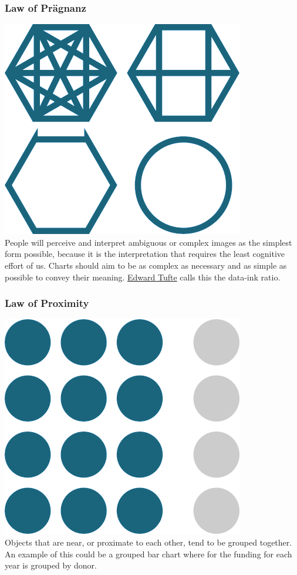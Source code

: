 \documentclass[
  a4paper,
  onecolumn,
  oneside]{book}
\begin{document}
\hypertarget{law-of-pruxe4gnanz}{%
\subsubsection{Law of Prägnanz}\label{law-of-pruxe4gnanz}}

\includegraphics{part1/images/lawofpragnanz.png}\\
People will perceive and interpret ambiguous or complex images as the
simplest form possible, because it is the interpretation that requires
the least cognitive effort of us. Charts should aim to be as complex as
necessary and as simple as possible to convey their meaning.
\href{https://en.wikipedia.org/wiki/Edward_Tufte}{Edward Tufte} calls
this the data-ink ratio.

\hypertarget{law-of-proximity}{%
\subsubsection{Law of Proximity}\label{law-of-proximity}}

\includegraphics{part1/images/lawofproximity.png}\\
Objects that are near, or proximate to each other, tend to be grouped
together.\\
An example of this could be a grouped bar chart where for the funding
for each year is grouped by donor.
\end{document}
